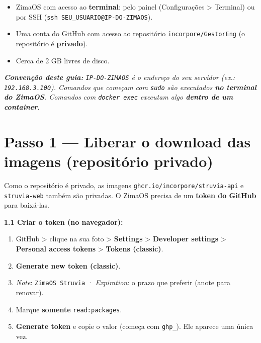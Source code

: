 \documentclass[
  10pt,
]{article}
\providecommand{\tightlist}{%
  \setlength{\itemsep}{0pt}\setlength{\parskip}{0pt}}
\renewenvironment{quote}{\begin{oldquote}\small\itshape}{\end{oldquote}}
\begin{document}
\begin{itemize}
\tightlist
\item
  ZimaOS com acesso ao \textbf{terminal}: pelo painel (Configurações
  \textgreater{} Terminal) ou por SSH
  (\texttt{ssh\ SEU\_USUARIO@IP-DO-ZIMAOS}).
\item
  Uma conta do GitHub com acesso ao repositório
  \texttt{incorpore/GestorEng} (o repositório é \textbf{privado}).
\item
  Cerca de 2 GB livres de disco.
\end{itemize}

\begin{quote}
\textbf{Convenção deste guia:} \texttt{IP-DO-ZIMAOS} é o endereço do seu
servidor (ex.: \texttt{192.168.3.100}). Comandos que começam com
\texttt{sudo} são executados \textbf{no terminal do ZimaOS}. Comandos
com \texttt{docker\ exec} executam algo \textbf{dentro de um container}.
\end{quote}

\hypertarget{passo-1-liberar-o-download-das-imagens-reposituxf3rio-privado}{%
\section{Passo 1 --- Liberar o download das imagens (repositório
privado)}\label{passo-1-liberar-o-download-das-imagens-reposituxf3rio-privado}}

Como o repositório é privado, as imagens
\texttt{ghcr.io/incorpore/struvia-api} e \texttt{struvia-web} também são
privadas. O ZimaOS precisa de um \textbf{token do GitHub} para
baixá-las.

\textbf{1.1 Criar o token (no navegador):}

\begin{enumerate}
\def\labelenumi{\arabic{enumi}.}
\tightlist
\item
  GitHub \textgreater{} clique na sua foto \textgreater{}
  \textbf{Settings} \textgreater{} \textbf{Developer settings}
  \textgreater{} \textbf{Personal access tokens} \textgreater{}
  \textbf{Tokens (classic)}.
\item
  \textbf{Generate new token (classic)}.
\item
  \emph{Note}: \texttt{ZimaOS\ Struvia} · \emph{Expiration}: o prazo que
  preferir (anote para renovar).
\item
  Marque \textbf{somente} \texttt{read:packages}.
\item
  \textbf{Generate token} e copie o valor (começa com \texttt{ghp\_}).
  Ele aparece uma única vez.
\end{enumerate}
\end{document}
